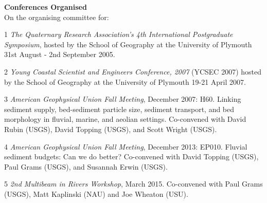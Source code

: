 \documentclass[margin,line]{resume}
\begin{document}
\begin{resume}
    \begin{footnotesize} 
    {\bf Conferences Organised}\\
	On the organising committee for:
	\begin{list1}
	\item[1] {\sl The Quaternary Research Association's 4th International Postgraduate Symposium}, hosted by the School of Geography at the University of Plymouth 31st August - 2nd September 2005.\\
	\item[2] {\sl Young Coastal Scientist and Engineers Conference, 2007} (YCSEC 2007)  hosted by the School of Geography at the University of Plymouth 19-21 April 2007. \\
	\item[3] {\sl American Geophysical Union Fall Meeting}, December 2007: H60. Linking sediment supply, bed-sediment particle size, sediment transport, and bed morphology in fluvial, marine, and aeolian settings. Co-convened with David Rubin (USGS), David Topping (USGS), and Scott Wright (USGS).\\
	\item[4] {\sl American Geophysical Union Fall Meeting}, December 2013: EP010. Fluvial sediment budgets: Can we do better? Co-convened with David Topping (USGS), Paul Grams (USGS), and Susannah Erwin (USGS).\\
	\item[5] {\sl 2nd Multibeam in Rivers Workshop}, March 2015. Co-convened with Paul Grams (USGS), Matt Kaplinski (NAU) and Joe Wheaton (USU).	
	\end{list1}
        \end{footnotesize}


\end{resume}
\end{document}
